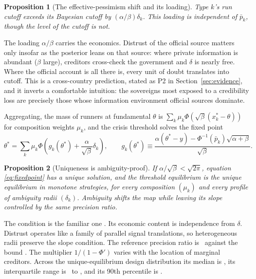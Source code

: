 \documentclass[11pt]{article}
\newtheorem{proposition}{Proposition}
\theoremstyle{definition}
\begin{document}
\begin{proposition}[The effective-pessimism shift and its loading]\label{prop:premium}
Type $k$'s run cutoff exceeds its Bayesian cutoff by $(\alpha/\beta)\delta_k$. This loading is independent of $\bar p_k$, though the level of the cutoff is not.
\end{proposition}

The loading $\alpha/\beta$ carries the economics. Distrust of the official source matters only insofar as the posterior leans on that source: where private information is abundant ($\beta$ large), creditors cross-check the government and $\delta$ is nearly free. Where the official account is all there is, every unit of doubt translates into cutoff. This is a cross-country prediction, stated as P2 in Section~\ref{sec:evidence}, and it inverts a comfortable intuition: the sovereigns most exposed to a credibility loss are precisely those whose information environment official sources dominate.

Aggregating, the mass of runners at fundamental $\theta$ is $\sum_k \mu_k \Phi(\sqrt{\beta}(x_k^* - \theta))$ for composition weights $\mu_k$, and the crisis threshold solves the fixed point
\begin{equation}
\theta^*=\sum_k\mu_k\Phi\!\left(g_k(\theta^*)+\frac{\alpha}{\sqrt\beta}\delta_k\right),
\qquad
g_k(\theta^*)\equiv
\frac{\alpha(\theta^*-y)-\Phi^{-1}(\bar p_k)\sqrt{\alpha+\beta}}{\sqrt\beta}.
\label{eq:fixedpoint}
\end{equation}

\begin{proposition}[Uniqueness is ambiguity-proof]\label{prop:unique}
If $\alpha/\sqrt{\beta} < \sqrt{2\pi}$, equation \eqref{eq:fixedpoint} has a unique solution, and the threshold equilibrium is the unique equilibrium in monotone strategies, for every composition $(\mu_k)$ and every profile of ambiguity radii $(\delta_k)$. Ambiguity shifts the map while leaving its slope controlled by the same precision ratio.
\end{proposition}

The condition is the familiar one \citep{Hellwig2002,MorrisShin2003}. Its economic content is independence from $\delta$. Distrust operates like a family of parallel signal translations, so heterogeneous radii preserve the slope condition. The reference precision ratio is \RatioVal\ against the bound \UniqBound. The multiplier $1/(1-\Phi')$ varies with the location of marginal creditors. Across the unique-equilibrium design distribution its median is \MultMedian, its interquartile range is \MultPtwentyfive\ to \MultPseventyfive, and its 90th percentile is \MultPninety.
\end{document}
